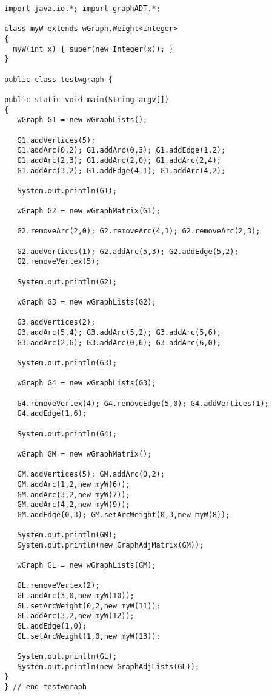 {\renewcommand{\ttdefault}{pcr} %
\footnotesize \begin{verbatim}
import java.io.*; import graphADT.*;

class myW extends wGraph.Weight<Integer> 
{ 
  myW(int x) { super(new Integer(x)); }
}

public class testwgraph {

public static void main(String argv[]) 
{
   wGraph G1 = new wGraphLists();

   G1.addVertices(5); 
   G1.addArc(0,2); G1.addArc(0,3); G1.addEdge(1,2); 
   G1.addArc(2,3); G1.addArc(2,0); G1.addArc(2,4); 
   G1.addArc(3,2); G1.addEdge(4,1); G1.addArc(4,2);

   System.out.println(G1);

   wGraph G2 = new wGraphMatrix(G1);

   G2.removeArc(2,0); G2.removeArc(4,1); G2.removeArc(2,3);

   G2.addVertices(1); G2.addArc(5,3); G2.addEdge(5,2);
   G2.removeVertex(5);

   System.out.println(G2);

   wGraph G3 = new wGraphLists(G2);

   G3.addVertices(2);
   G3.addArc(5,4); G3.addArc(5,2); G3.addArc(5,6);
   G3.addArc(2,6); G3.addArc(0,6); G3.addArc(6,0);

   System.out.println(G3);

   wGraph G4 = new wGraphLists(G3);

   G4.removeVertex(4); G4.removeEdge(5,0); G4.addVertices(1); 
   G4.addEdge(1,6);

   System.out.println(G4);

   wGraph GM = new wGraphMatrix();

   GM.addVertices(5); GM.addArc(0,2);
   GM.addArc(1,2,new myW(6));
   GM.addArc(3,2,new myW(7));
   GM.addArc(4,2,new myW(9));
   GM.addEdge(0,3); GM.setArcWeight(0,3,new myW(8));

   System.out.println(GM);
   System.out.println(new GraphAdjMatrix(GM));

   wGraph GL = new wGraphLists(GM);

   GL.removeVertex(2);
   GL.addArc(3,0,new myW(10));
   GL.setArcWeight(0,2,new myW(11));
   GL.addArc(3,2,new myW(12));
   GL.addEdge(1,0);
   GL.setArcWeight(1,0,new myW(13));

   System.out.println(GL);
   System.out.println(new GraphAdjLists(GL));
} 
} // end testwgraph
\end{verbatim}%
}

